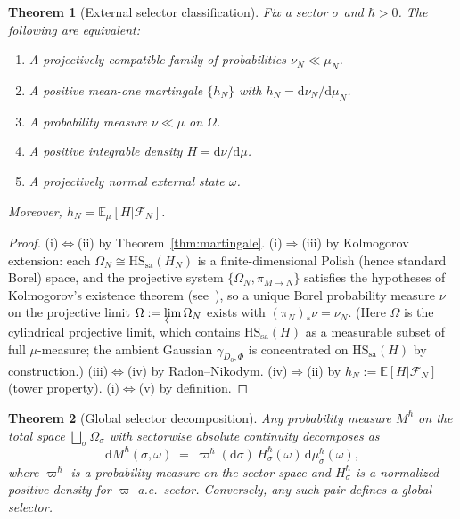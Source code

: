 \documentclass[12pt,a4paper]{article}
\theoremstyle{plain}
\newtheorem{theorem}{Theorem}[section]
\theoremstyle{definition}
\theoremstyle{remark}
\newcommand{\dd}{\mathrm{d}}
\newcommand{\HS}{\mathrm{HS}}
\newcommand{\sa}{\mathrm{sa}}
\newcommand{\cF}{\mathcal{F}}
\newcommand{\E}{\mathbb{E}}
\begin{document}
\begin{theorem}[External selector classification]
\label{thm:external-classification}
Fix a sector $\sigma$ and $\hbar > 0$.  The following are equivalent:
\begin{enumerate}[label=\textup{(\roman*)},leftmargin=2.5em]
  \item A projectively compatible family of probabilities
    $\nu_N \ll \mu_N$.
  \item A positive mean-one martingale $\{h_N\}$ with
    $h_N = \dd\nu_N/\dd\mu_N$.
  \item A probability measure $\nu \ll \mu$ on $\Omega$.
  \item A positive integrable density $H = \dd\nu/\dd\mu$.
  \item A projectively normal external state $\omega$.
\end{enumerate}
Moreover, $h_N = \E_\mu[H|\cF_N]$.
\end{theorem}

\begin{proof}
(i)$\Leftrightarrow$(ii) by Theorem~\ref{thm:martingale}.
(i)$\Rightarrow$(iii) by Kolmogorov extension: each $\Omega_N
\cong \HS_\sa(H_N)$ is a finite-dimensional Polish (hence standard
Borel) space, and the projective system $\{\Omega_N, \pi_{M\to N}\}$
satisfies the hypotheses of Kolmogorov's existence theorem
(see~\cite{Parthasarathy:1967}), so a unique Borel probability measure
$\nu$ on the projective limit
$\Omega := \varprojlim \Omega_N$ exists with $(\pi_N)_*\nu = \nu_N$.
(Here $\Omega$ is the cylindrical projective limit, which contains
$\HS_\sa(H)$ as a measurable subset of full $\mu$-measure; the ambient
Gaussian $\gamma_{D_0,\Phi}$ is concentrated on $\HS_\sa(H)$ by
construction.)
(iii)$\Leftrightarrow$(iv) by Radon--Nikodym.
(iv)$\Rightarrow$(ii) by $h_N := \E[H|\cF_N]$ (tower property).
(i)$\Leftrightarrow$(v) by definition.
\end{proof}

\begin{theorem}[Global selector decomposition]
\label{thm:global-selector}
Any probability measure $M^\hbar$ on the total space
$\bigsqcup_\sigma \Omega_\sigma$ with sectorwise absolute continuity
decomposes as
\begin{equation}
  \dd M^\hbar(\sigma,\omega)
  \;=\; \varpi^\hbar(\dd\sigma)\,H_\sigma^\hbar(\omega)\,
  \dd\mu_\sigma^\hbar(\omega),
\end{equation}
where $\varpi^\hbar$ is a probability measure on the sector space and
$H_\sigma^\hbar$ is a normalized positive density for
$\varpi$-a.e.\ sector.  Conversely, any such pair defines a global
selector.
\end{theorem}
\end{document}
